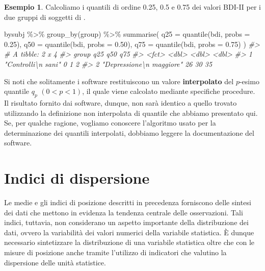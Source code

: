 \documentclass[
  10pt,
  italian,
  a4paper,
  extrafontsizes,onecolumn,openright
  ]{memoir}
\newenvironment{Shaded}{\begin{snugshade}}{\end{snugshade}}
\newcommand{\AttributeTok}[1]{\textcolor[rgb]{0.77,0.63,0.00}{#1}}
\newcommand{\CommentTok}[1]{\textcolor[rgb]{0.56,0.35,0.01}{\textit{#1}}}
\newcommand{\FloatTok}[1]{\textcolor[rgb]{0.00,0.00,0.81}{#1}}
\newcommand{\FunctionTok}[1]{\textcolor[rgb]{0.00,0.00,0.00}{#1}}
\newcommand{\NormalTok}[1]{#1}
\newcommand{\SpecialCharTok}[1]{\textcolor[rgb]{0.00,0.00,0.00}{#1}}
\theoremstyle{definition}
\theoremstyle{definition}
\newtheorem{example}{Esempio}[chapter]
\theoremstyle{definition}
\theoremstyle{definition}
\theoremstyle{remark}
\begin{document}
\begin{example}

Calcoliamo i quantili di ordine 0.25, 0.5 e 0.75 dei valori BDI-II per i due gruppi di soggetti di \textcite{zetschefuture2019}.

\begin{Shaded}
\begin{Highlighting}[]
\NormalTok{bysubj }\SpecialCharTok{\%\textgreater{}\%} 
  \FunctionTok{group\_by}\NormalTok{(group) }\SpecialCharTok{\%\textgreater{}\%} 
  \FunctionTok{summarise}\NormalTok{(}
    \AttributeTok{q25 =} \FunctionTok{quantile}\NormalTok{(bdi, }\AttributeTok{probs =} \FloatTok{0.25}\NormalTok{),}
    \AttributeTok{q50 =} \FunctionTok{quantile}\NormalTok{(bdi, }\AttributeTok{probs =} \FloatTok{0.50}\NormalTok{),}
    \AttributeTok{q75 =} \FunctionTok{quantile}\NormalTok{(bdi, }\AttributeTok{probs =} \FloatTok{0.75}\NormalTok{)}
\NormalTok{  ) }
\CommentTok{\#\textgreater{} \# A tibble: 2 x 4}
\CommentTok{\#\textgreater{}   group                      q25   q50   q75}
\CommentTok{\#\textgreater{}   \textless{}fct\textgreater{}                    \textless{}dbl\textgreater{} \textless{}dbl\textgreater{} \textless{}dbl\textgreater{}}
\CommentTok{\#\textgreater{} 1 "Controlli\textbackslash{}n sani"           0     1     2}
\CommentTok{\#\textgreater{} 2 "Depressione\textbackslash{}n maggiore"    26    30    35}
\end{Highlighting}
\end{Shaded}

\end{example}

Si noti che solitamente i software restituiscono un valore \textbf{interpolato} del \(p\)-esimo quantile \(q_p\) \((0 < p < 1)\), il quale viene calcolato mediante specifiche procedure. Il risultato fornito dai software, dunque, non sarà identico a quello trovato utilizzando la definizione non interpolata di quantile che abbiamo presentato qui. Se, per qualche ragione, vogliamo conoscere l'algoritmo usato per la determinazione dei quantili interpolati, dobbiamo leggere la documentazione del software.

\hypertarget{indici-di-dispersione}{%
\section{Indici di dispersione}\label{indici-di-dispersione}}

Le medie e gli indici di posizione descritti in precedenza forniscono
delle sintesi dei dati che mettono in evidenza la tendenza centrale
delle osservazioni. Tali indici, tuttavia, non considerano un aspetto
importante della distribuzione dei dati, ovvero la variabilità dei
valori numerici della variabile statistica. È dunque necessario
sintetizzare la distribuzione di una variabile statistica oltre che con
le misure di posizione anche tramite l'utilizzo di indicatori che
valutino la dispersione delle unità statistice.
\end{document}
